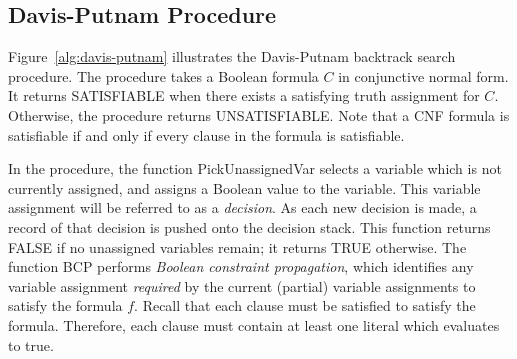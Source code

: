 \subsection{Davis-Putnam Procedure}
Figure~\ref{alg:davis-putnam} illustrates the Davis-Putnam backtrack search
procedure. The procedure takes a Boolean formula $C$ in conjunctive normal
form. It returns SATISFIABLE when there exists a satisfying truth assignment
for $C$. Otherwise, the procedure returns UNSATISFIABLE.
Note that a CNF formula is satisfiable if and only if every clause in the
formula is satisfiable.

In the procedure, the function {\sc PickUnassignedVar{}} selects a variable 
which is not currently assigned, and assigns a Boolean value to the variable. 
This variable assignment will be referred to as a {\em decision\/}. 
As each new decision is made, a record of that decision is pushed onto the
decision stack. 
This function returns FALSE if no unassigned variables remain; it returns
TRUE otherwise.
The function {\sc BCP} performs {\em Boolean constraint propagation\/}, which
identifies any variable assignment {\em required\/} by the current (partial)
variable assignments to satisfy the formula $f$. 
Recall that each clause must be satisfied to satisfy the formula.
Therefore, each clause must contain at least one literal which evaluates to
true. 

